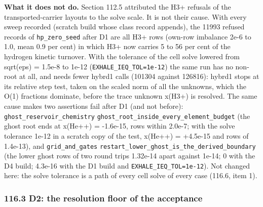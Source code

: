 \documentclass[english,a4paper]{my_memo}
\begin{document}
\textbf{What it does not do.} Section 112.5 attributed the H3+ refusals of the
transported-carrier layouts to the solve scale. It is not their cause. With
every sweep recorded (scratch build whose class record appends), the 11993
refused records of \texttt{hp\_zero\_seed} after D1 are all H3+ rows (own-row
imbalance 2e-6 to 1.0, mean 0.9 per cent) in which H3+ now carries 5 to 56
per cent of the hydrogen kinetic turnover. With the tolerance of the cell
solve lowered from sqrt(eps) = 1.5e-8 to 1e-12 (\texttt{EXHALE\_IEQ\_TOL=1e-12}) the
same run has no non-root at all, and needs fewer hybrd1 calls (101304
against 126816): hybrd1 stops at its relative step test, taken on the scaled
norm of all the unknowns, which the O(1) fractions dominate, before the trace
unknown x(H3+) is resolved. The same cause makes two assertions fail after
D1 (and not before): \texttt{ghost\_reservoir\_chemistry}
\texttt{ghost\_root\_inside\_every\_element\_budget} (the ghost root ends at x(He++) =
-1.6e-15, rows within 2.0e-7; with the solve tolerance 1e-12 in a scratch copy
of the test, x(He++) = +4.5e-15 and rows of 1.4e-13), and \texttt{grid\_and\_gates}
\texttt{restart\_lower\_ghost\_is\_the\_derived\_boundary} (the lower ghost rows of two
round trips 1.32e-14 apart against 1e-14; 0 with the D4 build; 4.3e-16 with
the D1 build and \texttt{EXHALE\_IEQ\_TOL=1e-12}). Not changed here: the solve
tolerance is a path of every cell solve of every case (116.6, item 1).

\subsubsection{116.3 D2: the resolution floor of the acceptance}\label{1163-d2-the-resolution-floor-of-the-acceptance}
\end{document}

